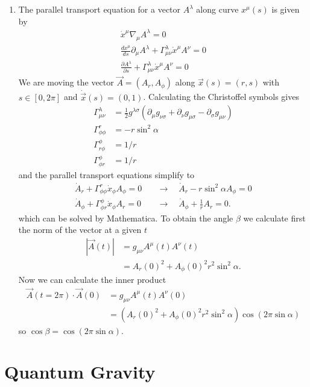\documentclass[10pt,a4paper]{article}
\theoremstyle{definition}
\begin{document}
\begin{enumerate}
\item The parallel transport equation for a vector $A^\lambda$ along curve $x^\mu(s)$ is given by
\begin{align}
\dot x^\mu\nabla_\mu A^\lambda=0\\
\frac{dx^\mu}{ds}\partial_\mu A^\lambda+\Gamma^\lambda_{\mu\nu}\dot x^{\mu}A^\nu=0\\
\frac{\partial A^\lambda}{\partial s}+\Gamma^\lambda_{\mu\nu}\dot x^{\mu}A^\nu=0
\end{align}
We are moving the vector $\vec{A}=(A_r,A_\phi)$ along $\vec{x}(s)=(r,s)$ with $s\in[0,2\pi]$ and $\dot{\vec{x}}(s)=(0,1)$. Calculating the Christoffel symbols gives 
\begin{align}
\Gamma^\lambda_{\mu\nu}&=\frac{1}{2}g^{\lambda\sigma}(\partial_\mu g_{\nu\sigma}+\partial_\nu g_{\mu\sigma}-\partial_\sigma g_{\mu\nu})\\
\Gamma^r_{\phi\phi}&=-r\sin^2\alpha\\
\Gamma^\phi_{r\phi}&=1/r\\
\Gamma^\phi_{\phi r}&=1/r
\end{align}
and the parallel transport equations simplify to
\begin{align}
\dot{A}_r+\Gamma^r_{\phi\phi}\dot{x}_\phi A_\phi=0&\quad\rightarrow\quad \dot{A}_r-r\sin^2\alpha A_\phi=0\\
\dot{A}_\phi+\Gamma^\phi_{\phi r}\dot{x}_\phi A_r=0&\quad\rightarrow\quad \dot{A}_\phi+\frac{1}{r}A_r=0.
\end{align}
which can be solved by Mathematica. To obtain the angle $\beta$ we calculate first the norm of the vector at a given $t$
\begin{align}
	|\vec{A}(t)|&=g_{\mu\nu}A^\mu(t) A^\nu(t)\\
	&=A_r(0)^2+A_\phi(0)^2r^2\sin^2\alpha.
\end{align}
Now we can calculate the inner product
\begin{align}
	\vec{A}(t=2\pi)\cdot\vec{A}(0)&=g_{\mu\nu}A^\mu(t) A^\nu(0)\\
	&=(A_r(0)^2+A_\phi(0)^2r^2\sin^2\alpha)\cos(2\pi\sin\alpha)
\end{align}
so $\cos\beta=\cos(2\pi\sin\alpha)$.

\end{enumerate}



\newpage
\section{Quantum Gravity}
\end{document}
